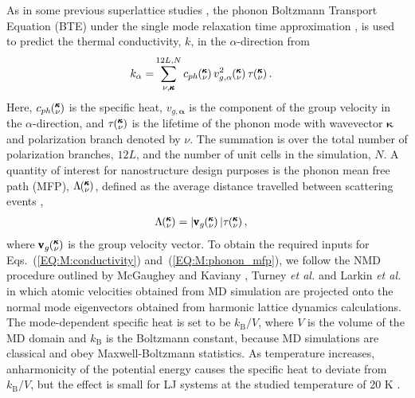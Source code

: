 As in some previous superlattice studies \cite{Luckyanova16112012,doi:10.1021/nl202186y}, the phonon Boltzmann Transport Equation (BTE) under the single mode relaxation time approximation \cite{ziman_electrons_2001}, is used to predict the thermal conductivity, $k$, in the $\alpha$-direction from
\begin{equation}\label{EQ:M:conductivity}
\begin{split}
k_{\mathbf{\alpha}}=&\sum_{\nu,\pmb{\kappa}}^{12L,N} c_{ph}\kv
v^{2}_{g,\mathbf{\alpha}}\kv \tau\kv.
\end{split}
\end{equation}
Here, $c_{ph}\mspace{-4.0mu}\left(\mspace{-8.0mu} \begin{smallmatrix}&\pmb{\kappa} \\&\nu\end{smallmatrix} \mspace{-3.0mu}\right)$ is the specific heat, $v_{g,\mathbf{\alpha}}$ is the component of the group velocity in the $\alpha$-direction, and $\tau\mspace{-4.0mu}\left(\mspace{-8.0mu} \begin{smallmatrix}&\pmb{\kappa} \\&\nu\end{smallmatrix} \mspace{-3.0mu}\right)$ is the lifetime of the phonon mode with wavevector $\pmb{\kappa}$ and polarization branch denoted by $\nu$. The summation is over the total number of polarization branches, $12L$, and the number of unit cells in the simulation, $N$. A quantity of interest for nanostructure design purposes \cite{PhysRevB.87.035437} is the phonon mean free path (MFP), $\Lambda\mspace{-4.0mu}\left(\mspace{-8.0mu} \begin{smallmatrix}&\pmb{\kappa} \\&\nu\end{smallmatrix} \mspace{-3.0mu}\right)$, defined as the average distance travelled between scattering events \cite{ziman_electrons_2001},
\begin{equation}\label{EQ:M:phonon_mfp}
\begin{split}
\Lambda\kv &= |\pmb{\mathrm{v}}_{g}\kv | \tau\kv,
\end{split}
\end{equation}
where $\pmb{\mathrm{v}}_{g}\mspace{-4.0mu}\left(\mspace{-8.0mu} \begin{smallmatrix}&\pmb{\kappa} \\&\nu\end{smallmatrix} \mspace{-3.0mu}\right)$ is the group velocity vector. To obtain the required inputs for Eqs.~(\ref{EQ:M:conductivity}) and~(\ref{EQ:M:phonon_mfp}), we follow the NMD procedure outlined by McGaughey and Kaviany \cite{PhysRevB.71.184305}, Turney \textit{et al.} \cite {PhysRevB.79.064301} and Larkin \textit{et al.} \cite{jason_inpress} in which atomic velocities obtained from MD simulation are projected onto the normal mode eigenvectors obtained from harmonic lattice dynamics calculations. The mode-dependent specific heat is set to be $k_\mathrm{B}/V$, where $V$ is the volume of the MD domain and $k_\mathrm{B}$ is the Boltzmann constant, because MD simulations are classical and obey Maxwell-Boltzmann statistics. As temperature increases, anharmonicity of the potential energy causes the specific heat to deviate from $k_\mathrm{B}/V$, but the effect is small for LJ systems at the studied temperature of 20 K \cite{PhysRevB.71.184305}.

